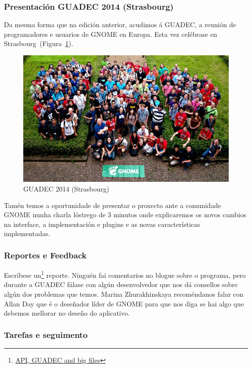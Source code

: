\subsubsection{Presentación GUADEC 2014 (Strasbourg)}
Da mesma forma que na edición anterior, acudimos á GUADEC, a reunión de programadores e usuarios de GNOME en Europa. Esta vez celébrase en Strasbourg~(Figura~\ref{fig:guadec2014}).

\begin{figure}[h!]
    \centering
    \includegraphics[width=0.999\textwidth]{img/guadec_2014.jpg}
    \caption{GUADEC 2014 (Strasbourg)}
    \label{fig:guadec2014}
\end{figure}

Tamén temos a oportunidade de presentar o proxecto ante a comunidade GNOME nunha charla lóstrego de 3 minutos onde explicaremos os novos cambios na interface, a implementación e plugins e as novas características implementadas.

\subsubsection{Reportes e Feedback}

Escríbese un\footnote{\href{http://aquelando.info/api-guadec-and-big-files/}{API, GUADEC and big files}} reporte. Ninguén fai comentarios no blogue sobre o programa, pero durante a GUADEC fálase con algún desenvolvedor que nos dá consellos sobre algún dos problemas que temos. Marina Zhurakhinskaya recoméndanos falar con Allan Day que é o deseñador líder de GNOME para que nos diga se hai algo que debemos mellorar no deseño do aplicativo.

\subsubsection{Tarefas e seguimento}

